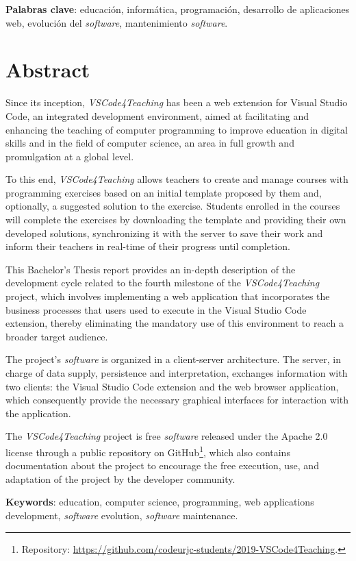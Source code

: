 \noindent \textbf{Palabras clave}: educación, informática, programación, desarrollo de aplicaciones web, evolución del \textit{software}, mantenimiento \textit{software}.


\chapter*{Abstract}

Since its inception, \textit{VSCode4Teaching} has been a web extension for Visual Studio Code, an integrated development environment, aimed at facilitating and enhancing the teaching of computer programming to improve education in digital skills and in the field of computer science, an area in full growth and promulgation at a global level.

To this end, \textit{VSCode4Teaching} allows teachers to create and manage courses with programming exercises based on an initial template proposed by them and, optionally, a suggested solution to the exercise. Students enrolled in the courses will complete the exercises by downloading the template and providing their own developed solutions, synchronizing it with the server to save their work and inform their teachers in real-time of their progress until completion.

This Bachelor's Thesis report provides an in-depth description of the development cycle related to the fourth milestone of the \textit{VSCode4Teaching} project, which involves implementing a web application that incorporates the business processes that users used to execute in the Visual Studio Code extension, thereby eliminating the mandatory use of this environment to reach a broader target audience.

The project's \textit{software} is organized in a client-server architecture. The server, in charge of data supply, persistence and interpretation, exchanges information with two clients: the Visual Studio Code extension and the web browser application, which consequently provide the necessary graphical interfaces for interaction with the application.

The \textit{VSCode4Teaching} project is free \textit{software} released under the Apache 2.0 license through a public repository on GitHub\footnote{Repository: \href{https://github.com/codeurjc-students/2019-VSCode4Teaching}{https://github.com/codeurjc-students/2019-VSCode4Teaching}.}, which also contains documentation about the project to encourage the free execution, use, and adaptation of the project by the developer community.

\vspace{2pt}

\noindent \textbf{Keywords}: education, computer science, programming, web applications development, \textit{software} evolution, \textit{software} maintenance.
